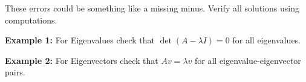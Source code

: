 \vspace{2cm}
\begin{center}
    \begin{Large}
    \end{Large}

    These errors could be something like a missing minus. Verify all solutions using computations. 

    \textbf{Example 1:} For Eigenvalues check that $\det(A - \lambda I) = 0$ for all eigenvalues. 

    \textbf{Example 2:} For Eigenvectors check that $Av = \lambda v$ for all eigenvalue-eigenvector pairs. 
\end{center}
